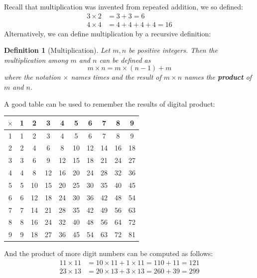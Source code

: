 \documentclass[12pt]{article}
\newtheorem{definition}{Definition}[section]
\begin{document}
    Recall that multiplication was invented from repeated addition, we so defined: \begin{align*}
        3\times 2&=3+3=6\\
        4\times 4&=4+4+4+4=16
    \end{align*}
    Alternatively, we can define multiplication by a recursive definition:

    \begin{definition}[Multiplication]
        Let $m,n$ be positive integers. Then the multiplication among $m$ and $n$ can be defined as $$m\times n= m\times (n-1) + m$$
        where the notation $\times$ names times and the result of $m\times n$ names the \textbf{product} of $m$ and $n$.
    \end{definition}

    A good table can be used to remember the results of digital product:

    \begin{center}
        \begin{tabular}{|c||c|c|c|c|c|c|c|c|c|}
            \hline
            $\times$&1&2&3&4&5&6&7&8&9\\
            \hline
            \hline
            1&1&2&3&4&5&6&7&8&9\\
            \hline
            2&2&4&6&8&10&12&14&16&18\\
            \hline
            3&3&6&9&12&15&18&21&24&27\\
            \hline
            4&4&8&12&16&20&24&28&32&36\\
            \hline
            5&5&10&15&20&25&30&35&40&45\\
            \hline
            6&6&12&18&24&30&36&42&48&54\\
            \hline
            7&7&14&21&28&35&42&49&56&63\\
            \hline
            8&8&16&24&32&40&48&56&64&72\\
            \hline
            9&9&18&27&36&45&54&63&72&81\\
            \hline
        \end{tabular}
    \end{center}

    And the product of more digit numbers can be computed as follows:\begin{align*}
        11\times 11&=10\times 11 + 1\times 11=110+11=121\\
        23\times 13&=20\times 13 + 3\times 13=260+39=299
    \end{align*}
\end{document}
